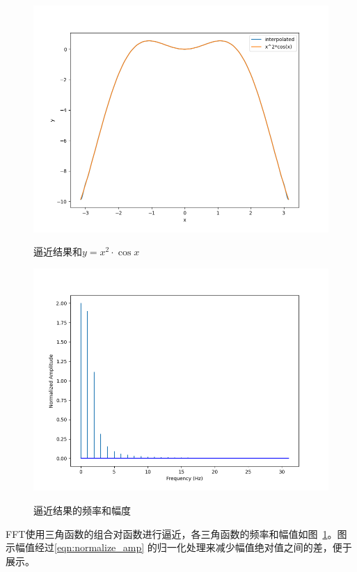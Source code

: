 \documentclass[a4paper,twoside]{article}
\begin{document}
\begin{spacing}{1.2}
\begin{figure}[htbp]
	\begin{minipage}[t]{0.48\linewidth}
		\centering
		\label{fig:result}
		\includegraphics[width=\linewidth]{result.png}
		\caption{逼近结果和$y=x^2\cdot\cos x$}
	\end{minipage}
	\begin{minipage}[t]{0.48\linewidth}
		\centering
		\label{fig:freqs}
		\includegraphics[width=\linewidth]{freqs.png}
		\caption{逼近结果的频率和幅度}
	\end{minipage}
\end{figure}

FFT使用三角函数的组合对函数进行逼近，各三角函数的频率和幅值如图~\ref{fig:freqs}。图示幅值经过\eqref{eqn:normalize_amp}
的归一化处理来减少幅值绝对值之间的差，便于展示。


\end{spacing}
\end{document}

